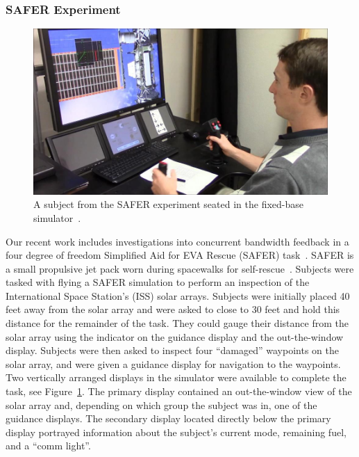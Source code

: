 \documentclass[float=false, crop=false]{standalone}
\begin{document}
\subsubsection{SAFER Experiment}
\begin{figure}[tb]
    \begin{center}
        \includegraphics[width=0.8\linewidth]{./../img/SAFER_DangerChris.jpg}
        \caption{A subject from the SAFER experiment seated in the fixed-base simulator~\cite{Karasinski2016Masters}.}
        \label{figure:safersim}
    \end{center}
\end{figure}

Our recent work includes investigations into concurrent bandwidth feedback in a four degree of freedom Simplified Aid for EVA Rescue (SAFER) task~\cite{Karasinski2016Masters, Karasinski2017, Karasinski2016}.
SAFER is a small propulsive jet pack worn during spacewalks for self-rescue~\cite{Vassigh1998}.
Subjects were tasked with flying a SAFER simulation to perform an inspection of the International Space Station's (ISS) solar arrays.
Subjects were initially placed 40 feet away from the solar array and were asked to close to 30 feet and hold this distance for the remainder of the task.
They could gauge their distance from the solar array using the indicator on the guidance display and the out-the-window display.
Subjects were then asked to inspect four ``damaged'' waypoints on the solar array, and were given a guidance display for navigation to the waypoints. %
Two vertically arranged displays in the simulator were available to complete the task, see Figure~\ref{figure:safersim}.
The primary display contained an out-the-window view of the solar array and, depending on which group the subject was in, one of the guidance displays. %
The secondary display located directly below the primary display portrayed information about the subject's current mode, remaining fuel, and a ``comm light''.
\end{document}
